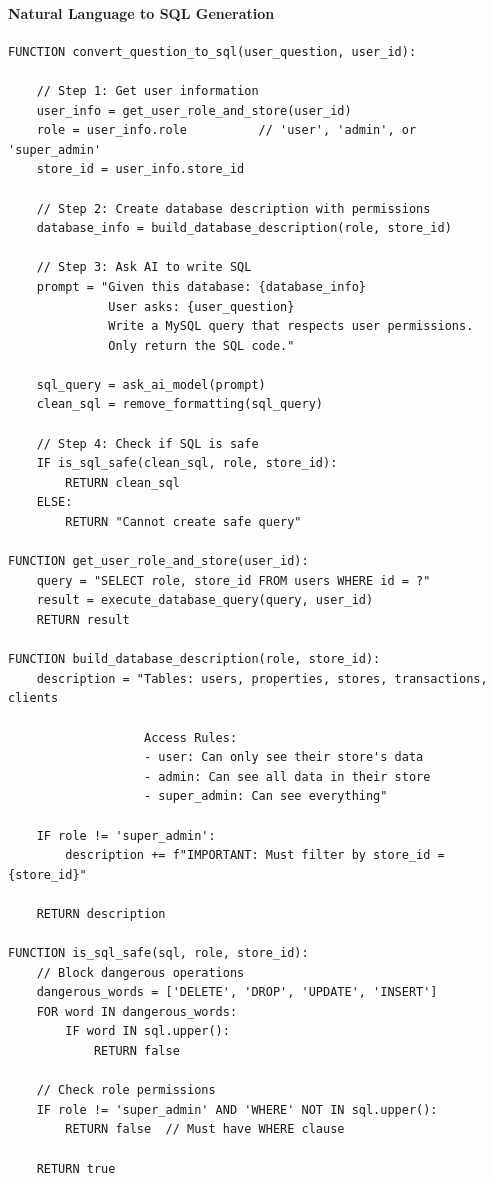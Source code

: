 \paragraph{Natural Language to SQL Generation}
\begin{verbatim}
FUNCTION convert_question_to_sql(user_question, user_id):
    
    // Step 1: Get user information
    user_info = get_user_role_and_store(user_id)
    role = user_info.role          // 'user', 'admin', or 'super_admin'
    store_id = user_info.store_id
    
    // Step 2: Create database description with permissions
    database_info = build_database_description(role, store_id)
    
    // Step 3: Ask AI to write SQL
    prompt = "Given this database: {database_info}
              User asks: {user_question}
              Write a MySQL query that respects user permissions.
              Only return the SQL code."
    
    sql_query = ask_ai_model(prompt)
    clean_sql = remove_formatting(sql_query)
    
    // Step 4: Check if SQL is safe
    IF is_sql_safe(clean_sql, role, store_id):
        RETURN clean_sql
    ELSE:
        RETURN "Cannot create safe query"

FUNCTION get_user_role_and_store(user_id):
    query = "SELECT role, store_id FROM users WHERE id = ?"
    result = execute_database_query(query, user_id)
    RETURN result

FUNCTION build_database_description(role, store_id):
    description = "Tables: users, properties, stores, transactions, clients
                   
                   Access Rules:
                   - user: Can only see their store's data
                   - admin: Can see all data in their store  
                   - super_admin: Can see everything"
    
    IF role != 'super_admin':
        description += f"IMPORTANT: Must filter by store_id = {store_id}"
    
    RETURN description

FUNCTION is_sql_safe(sql, role, store_id):
    // Block dangerous operations
    dangerous_words = ['DELETE', 'DROP', 'UPDATE', 'INSERT']
    FOR word IN dangerous_words:
        IF word IN sql.upper():
            RETURN false
    
    // Check role permissions
    IF role != 'super_admin' AND 'WHERE' NOT IN sql.upper():
        RETURN false  // Must have WHERE clause
    
    RETURN true
\end{verbatim}

